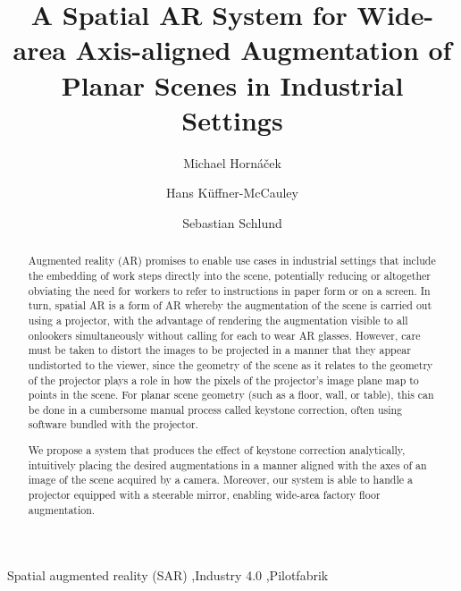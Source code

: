 \documentclass[review]{elsarticle}
\begin{document}
\begin{frontmatter}

\title{A Spatial AR System for Wide-area Axis-aligned Augmentation of Planar Scenes in Industrial Settings} %

\author{Michael Horn\'{a}\v{c}ek}
\author{Hans K\"{u}ffner-McCauley}
\author{Sebastian Schlund}
\address{Human Centered Cyber Physical Production and Assembly Systems, Institute for Management Sciences, TU Vienna, Austria}

\begin{abstract}
Augmented reality (AR) promises to enable use cases in industrial settings that include the embedding of work steps directly into the scene, potentially reducing or altogether obviating the need for workers to refer to instructions in paper form or on a screen. In turn, spatial AR is a form of AR whereby the augmentation of the scene is carried out using a projector, with the advantage of rendering the augmentation visible to all onlookers simultaneously without calling for each to wear AR glasses. However, care must be taken to distort the images to be projected in a manner that they appear undistorted to the viewer, since the geometry of the scene as it relates to the geometry of the projector plays a role in how the pixels of the projector's image plane map to points in the scene. For planar scene geometry (such as a floor, wall, or table), this can be done in a cumbersome manual process called keystone correction, often using software bundled with the projector.

We propose a system that produces the effect of keystone correction analytically, intuitively placing the desired augmentations in a manner aligned with the axes of an image of the scene acquired by a camera. Moreover, our system is able to handle a projector equipped with a steerable mirror, enabling wide-area factory floor augmentation.
\end{abstract}

\begin{keyword}
Spatial augmented reality (SAR) \sep Industry 4.0 \sep Pilotfabrik
\end{keyword}

\end{frontmatter}
\end{document}
